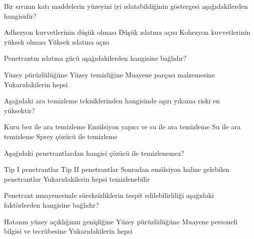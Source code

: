 \begin{question}[subtitle=]
  Bir sıvının katı maddelerin yüzeyini iyi ıslatabildiğinin göstergesi aşağıdakilerden hangisidir?
  \begin{tasks}
    \task Adhezyon kuvvetlerinin düşük olması
    \task Düşük ıslatma açısı \correct
    \task Kohezyon kuvvetlerinin yüksek olması
    \task Yüksek ıslatma açısı
  \end{tasks}
\end{question}
\begin{solution}
	\correct
\end{solution}

\begin{question}[subtitle=]
  Penetrantın ıslatma gücü aşağıdakilerden hangisine bağlıdır?
  \begin{tasks}
    \task Yüzey pürüzlülüğüne
    \task Yüzey temizliğine
    \task Muayene parçası malzemesine
    \task Yukarıdakilerin hepsi \correct
  \end{tasks}
\end{question}
\begin{solution}
	\correct
\end{solution}


\begin{question}[subtitle=]
  Aşağıdaki ara temizleme tekniklerinden hangisinde aşırı yıkama riski en yüksektir?
  \begin{tasks}
    \task Kuru bez ile ara temizleme
    \task Emülsiyon yapıcı ve su ile ara temizleme
    \task Su ile ara temizleme
    \task Sprey çözücü ile temizleme \correct
  \end{tasks}
\end{question}
\begin{solution}
	\correct
\end{solution}

\begin{question}[subtitle=]
  Aşağıdaki penetrantlardan hangisi çözücü ile temizlenemez?
  \begin{tasks}
    \task Tip I penetrantlar
    \task Tip II penetrantlar 
    \task Sonradan emülsiyon haline gelebilen penetrantlar
    \task Yukarıdakilerin hepsi temizlenebilir \correct
  \end{tasks}
\end{question}
\begin{solution}
	\correct
\end{solution}

\begin{question}[subtitle=]
  Penetrant muayenesinde süreksizliklerin tespit edilebilirliliği aşağıdaki faktörlerden hangisine bağlıdır?
  \begin{tasks}
    \task Hatanın yüzey açıklığının genişliğine
    \task Yüzey pürüzlülüğüne
    \task Muayene personeli bilgisi ve tecrübesine
    \task Yukarıdakilerin hepsi \correct
  \end{tasks}
\end{question}
\begin{solution}
	\correct
\end{solution}

